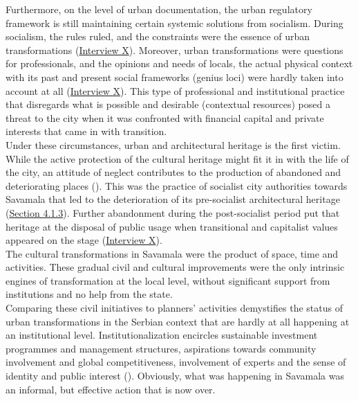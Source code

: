 \documentclass[11pt]{report}
\begin{document}
{{{Furthermore, on the level of urban documentation, the urban regulatory framework is still maintaining certain systemic solutions from socialism. During socialism, the rules ruled, and the constraints were the essence of urban transformations (\href{InterviewX}{Interview X}).
Moreover, urban transformations were questions for professionals, and the opinions and needs of locals, the  actual physical context with its past and present social frameworks (genius loci) were hardly taken into account at all (\href{InterviewX}{Interview X}).
This type of professional and institutional practice that disregards what is possible and desirable (contextual resources) posed a threat to the city when it was confronted with financial capital and private interests that came in with transition.
\\

Under these circumstances, urban and architectural heritage is the first victim. While the active protection of the cultural heritage might fit it in with the life of the city, an  attitude of neglect contributes to the production of abandoned and deteriorating places  
(\href{Vanista}{\cite{doytchinov_urban_2015}}).
This was the practice of socialist city authorities towards Savamala that led to the deterioration of its pre-socialist architectural heritage (\href{Section 4.1.3}{Section 4.1.3}).
Further abandonment during the post-socialist period put that heritage at the disposal of public usage when transitional and capitalist values appeared on the stage
(\href{InterviewX}{Interview X}).
\\

The cultural transformations in Savamala were the product of space, time and activities. These gradual civil and cultural improvements were the only intrinsic engines of transformation at the local level, without significant support from institutions and no help from the state.
\\

Comparing these civil initiatives to planners’ activities demystifies the status of urban transformations in the Serbian context that are hardly at all happening at an institutional level. Institutionalization encircles sustainable investment programmes and management structures, aspirations towards community involvement and global competitiveness, involvement of experts and the sense of identity and public interest 
(\href{Volic}{\citealt{volic_belgrade_2012}}).
Obviously, what was happening in Savamala was an informal, but effective action that is now over.
    
}}}
\end{document}
